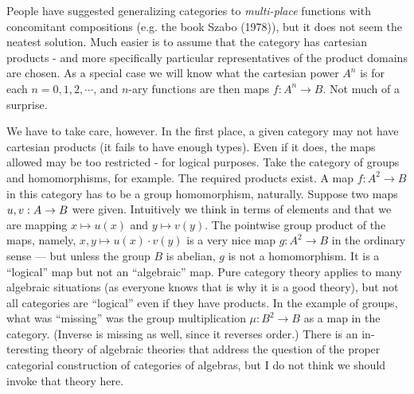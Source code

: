 People have suggested generalizing categories to {\it multi-place} functions with concomitant compositions (e.g. the book Szabo (1978)), but it does not seem the neatest solution. Much easier is to assume that the category has cartesian products - and more specifically particular representatives of the product
domains are chosen. As a special case we will know what the cartesian power $A^n$ is for each $n=0,1,2,\cdots$, and $n$-ary functions
are then maps $f: A^n\to B$. Not much of a surprise.

We have to take care, however. In the first place, a given category may not have cartesian products (it fails to have enough types). Even if it does, the maps allowed may be too restricted - for logical purposes. Take the category of groups and homomorphisms, for example. The required products exist.
A map $f : A^2 \to B$ in this category has to be a group homomor­phism, naturally. Suppose two maps $u,v: A \rightarrow B$ were given.
Intuitively we think in terms of elements and that we are map­ping $x \mapsto u(x)$ and $y \mapsto v(y)$. The pointwise group product of the maps, namely, $x,y \mapsto  u(x) \cdot v(y)$ is a very nice map $g : A^2 \to B$ in the ordinary sense --- but unless the group $B$ is abelian, $g$ is not a homomorphism. It is a ``logical'' map but not an ``algebra­ic'' map. Pure category theory applies to many algebraic situa­tions (as everyone knows that is why it is a good theory), but not all categories are ``logical'' even if they have products. In the example of groups, what was ``missing'' was the group
multiplication $\mu: B^2 \to B$ as a map in the category. (Inverse is missing as well, since it reverses order.) There is an in­teresting theory of algebraic theories that address the ques­tion of the proper categorial construction of categories of al­gebras, but I do not think we should invoke that theory here.

